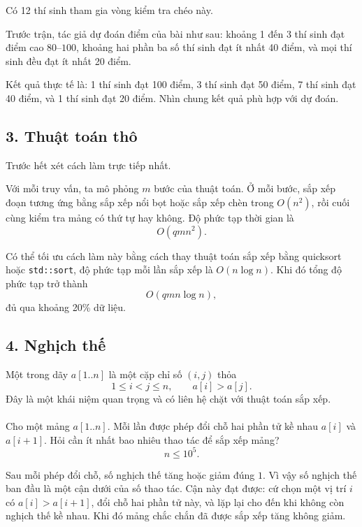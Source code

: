 \documentclass[11pt]{article}
\begin{document}
Có 12 thí sinh tham gia vòng kiểm tra chéo này.

Trước trận, tác giả dự đoán điểm của bài như sau: khoảng 1 đến 3 thí sinh đạt
điểm cao \(80\)--\(100\), khoảng hai phần ba số thí sinh đạt ít nhất 40 điểm,
và mọi thí sinh đều đạt ít nhất 20 điểm.

Kết quả thực tế là: 1 thí sinh đạt 100 điểm, 3 thí sinh đạt 50 điểm, 7 thí
sinh đạt 40 điểm, và 1 thí sinh đạt 20 điểm. Nhìn chung kết quả phù hợp với
dự đoán.

\subsection*{3. Thuật toán thô}

Trước hết xét cách làm trực tiếp nhất.

Với mỗi truy vấn, ta mô phỏng \(m\) bước của thuật toán. Ở mỗi bước, sắp xếp
đoạn tương ứng bằng sắp xếp nổi bọt hoặc sắp xếp chèn trong \(O(n^2)\), rồi
cuối cùng kiểm tra mảng có thứ tự hay không. Độ phức tạp thời gian là
\[
  O(qmn^2).
\]

Có thể tối ưu cách làm này bằng cách thay thuật toán sắp xếp bằng quicksort
hoặc \texttt{std::sort}, độ phức tạp mỗi lần sắp xếp là \(O(n\log n)\). Khi đó
tổng độ phức tạp trở thành
\[
  O(qmn\log n),
\]
đủ qua khoảng 20\% dữ liệu.

\subsection*{4. Nghịch thế}

Một  trong dãy \(a[1..n]\) là một cặp chỉ số \((i,j)\) thỏa
\[
  1\le i<j\le n,\qquad a[i]>a[j].
\]
Đây là một khái niệm quan trọng và có liên hệ chặt với thuật toán sắp xếp.

\paragraph{}
Cho một mảng \(a[1..n]\). Mỗi lần được phép đổi chỗ hai phần tử kề nhau
\(a[i]\) và \(a[i+1]\). Hỏi cần ít nhất bao nhiêu thao tác để sắp xếp mảng?
\[
  n\le 10^5.
\]

Sau mỗi phép đổi chỗ, số nghịch thế tăng hoặc giảm đúng \(1\). Vì vậy số
nghịch thế ban đầu là một cận dưới của số thao tác. Cận này đạt được: cứ chọn
một vị trí \(i\) có \(a[i]>a[i+1]\), đổi chỗ hai phần tử này, và lặp lại cho
đến khi không còn nghịch thế kề nhau. Khi đó mảng chắc chắn đã được sắp xếp
tăng không giảm.
\end{document}
